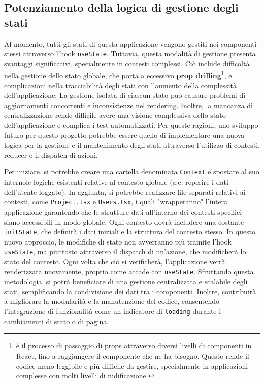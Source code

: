 \documentclass[target=bach,aauheader=,style=]{thud}
\begin{document}
\subsection{Potenziamento della logica di gestione degli stati}
Al momento, tutti gli stati di questa applicazione vengono gestiti nei componenti stessi attraverso l'hook \texttt{useState}. Tuttavia, questa modalità di gestione presenta svantaggi significativi, specialmente in contesti complessi. Ciò include difficoltà nella gestione dello stato globale, che porta a eccessivo \textbf{prop drilling}\footnote{è il processo di passaggio di props attraverso diversi livelli di componenti in React, fino a raggiungere il componente che ne ha bisogno. Questo rende il codice meno leggibile e più difficile da gestire, specialmente in applicazioni complesse con molti livelli di nidificazione.}, e complicazioni nella tracciabilità degli stati con l'aumento della complessità dell'applicazione. La gestione isolata di ciascun stato può causare problemi di aggiornamenti concorrenti e inconsistenze nel rendering. Inoltre, la mancanza di centralizzazione rende difficile avere una visione complessiva dello stato dell'applicazione e complica i test automatizzati. Per queste ragioni, uno sviluppo futuro per questo progetto potrebbe essere quello di implementare una nuova logica per la gestione e il mantenimento degli stati attraverso l'utilizzo di contesti, reducer e il dispatch di azioni. 

\noindent Per iniziare, si potrebbe creare una cartella denominata \texttt{Context} e spostare al suo internole logiche esistenti relative al contesto globale (a.e. reperire i dati dell'utente loggato). In aggiunta, si potrebbe realizzare file separati relativi ai contesti, come \texttt{Project.tsx} e \texttt{Users.tsx}, i quali "wrapperanno" l'intera applicazione garantendo che le strutture dati all'interno dei contesti specifici siano accessibili in modo globale. Ogni contesto dovrà includere una costante \texttt{initState}, che definirà i dati iniziali e la struttura del contesto stesso. In questo nuovo approccio, le modifiche di stato non avverranno più tramite l'hook \texttt{useState}, ma piuttosto attraverso il dispatch di un'azione, che modificherà lo stato del contesto. Ogni volta che ciò si verificherà, l'applicazione verrà renderizzata nuovamente, proprio come accade con \texttt{useState}. Sfruttando questa metodologia, si potrà beneficiare di una gestione centralizzata e scalabile degli stati, semplificando la condivisione dei dati tra i componenti. Inoltre, contribuirà a migliorare la modularità e la manutenzione del codice, consentendo l'integrazione di funzionalità come un indicatore di \texttt{loading} durante i cambiamenti di stato o di pagina.
\end{document}

